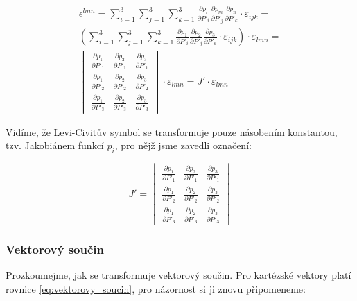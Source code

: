 \begin{equation}
\begin{split}
\epsilon^{lmn} = \sum_{i=1}^3 \sum_{j=1}^3 \sum_{k=1}^3 \frac{\partial p_l}{\partial P'_i} \frac{\partial p_m}{\partial P'_j} \frac{\partial p_n}{\partial P'_k} \cdot \varepsilon_{ijk} = \\
\left(\sum_{i=1}^3 \sum_{j=1}^3 \sum_{k=1}^3 \frac{\partial p_1}{\partial P'_i} \frac{\partial p_2}{\partial P'_j} \frac{\partial p_3}{\partial P'_k} \cdot \varepsilon_{ijk} \right) \cdot \varepsilon_{lmn} = \\
\begin{vmatrix}
  \frac{\partial p_1}{\partial P'_1} & \frac{\partial p_2}{\partial P'_1} & \frac{\partial p_3}{\partial P'_1} \\
  \frac{\partial p_1}{\partial P'_2} & \frac{\partial p_2}{\partial P'_2} & \frac{\partial p_3}{\partial P'_2} \\
  \frac{\partial p_1}{\partial P'_3} & \frac{\partial p_2}{\partial P'_3} & \frac{\partial p_3}{\partial P'_3}
\end{vmatrix}
\cdot \varepsilon_{lmn}  = J' \cdot \varepsilon_{lmn}
\end{split}
\end{equation}

Vidíme, že Levi-Civitův symbol se transformuje pouze násobením konstantou, tzv. Jakobiánem funkcí \(p_i\), pro nějž jsme zavedli označení:

\begin{equation}
J' = \begin{vmatrix}
  \frac{\partial p_1}{\partial P'_1} & \frac{\partial p_2}{\partial P'_1} & \frac{\partial p_3}{\partial P'_1} \\
  \frac{\partial p_1}{\partial P'_2} & \frac{\partial p_2}{\partial P'_2} & \frac{\partial p_3}{\partial P'_2} \\
  \frac{\partial p_1}{\partial P'_3} & \frac{\partial p_2}{\partial P'_3} & \frac{\partial p_3}{\partial P'_3}
\end{vmatrix}
\end{equation}

\subsubsection{Vektorový součin}

Prozkoumejme, jak se transformuje vektorový součin. Pro kartézské vektory platí rovnice \eqref{eq:vektorovy_soucin}, pro názornost si ji znovu připomeneme:

